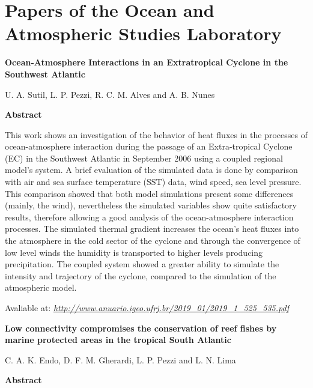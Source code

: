 \chapter{\large{Papers of the Ocean and Atmospheric Studies Laboratory}}
\bigskip


\noindent \begin{center}
\textbf{Ocean-Atmosphere Interactions in an Extratropical Cyclone in the Southwest Atlantic}
\bigskip

\noindent U. A. Sutil, L. P. Pezzi, R. C. M. Alves and A. B. Nunes
\bigskip

\noindent \textbf{Abstract}\end{center}
\bigskip

\noindent This work shows an investigation of the behavior of heat fluxes in the processes of ocean-atmosphere interaction
during the passage of an Extra-tropical Cyclone (EC) in the Southwest Atlantic in September 2006 using a coupled
regional model’s system. A brief evaluation of the simulated data is done by comparison with air and sea surface temperature (SST) data, wind speed, sea level pressure. This comparison showed that both model simulations present some
differences (mainly, the wind), nevertheless the simulated variables show quite satisfactory results, therefore allowing a
good analysis of the ocean-atmosphere interaction processes. The simulated thermal gradient increases the ocean’s heat
fluxes into the atmosphere in the cold sector of the cyclone and through the convergence of low level winds the humidity
is transported to higher levels producing precipitation. The coupled system showed a greater ability to simulate the intensity and trajectory of the cyclone, compared to the simulation of the atmospheric model.
\bigskip

\noindent \textcolor{black}{}
\bigskip

\noindent Avaliable at: \textcolor{bleu_cite}{\href{http://www.anuario.igeo.ufrj.br/2019\_01/2019\_1\_525\_535.pdf}{\textit{http://www.anuario.igeo.ufrj.br/2019\_01/2019\_1\_525\_535.pdf}}}
\bigskip

\newpage
\noindent \begin{center}
\textbf{Low connectivity compromises the conservation of reef fishes by marine protected areas in the tropical South Atlantic}
\bigskip

\noindent C. A. K. Endo, D. F. M. Gherardi, L. P. Pezzi and L. N. Lima
\bigskip

\noindent \textbf{Abstract}\end{center}
\bigskip

